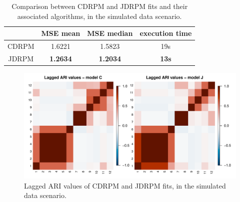 \documentclass[12pt,	%
	a4paper,		%
	twoside,		%
	openright,		%
	titlepage,%
	]{book}
\theoremstyle{definition}
\begin{document}
\begin{table}[!htb]
    \caption[Comparison of CDRPM and JDRPM, simulated data scenario]{Comparison between CDRPM and JDRPM fits and their associated algorithms, in the simulated data scenario.}
    \centering
    \begin{tabular}{cccc}
    \toprule
          & MSE mean &  MSE median & execution time  \\
       \midrule
        CDRPM &   1.6221  &  1.5823  & 19s\\
        JDRPM & \textbf{1.2634}  & \textbf{1.2034}  &   \textbf{13s} \\
        \bottomrule
    \end{tabular}
    \label{tab: fits metrics no space}
\end{table}

\begin{figure}[!htb]
    \centering
    \includegraphics[width=1\linewidth]{Testing/Assessing correctness/no space/ari.pdf}
    \caption[Lagged ARI values of CDRPM and JDRPM, simulated data scenario]{Lagged ARI values of CDRPM and JDRPM fits, in the simulated data scenario.}
    \label{fig:ari no space}
\end{figure}
\end{document}
